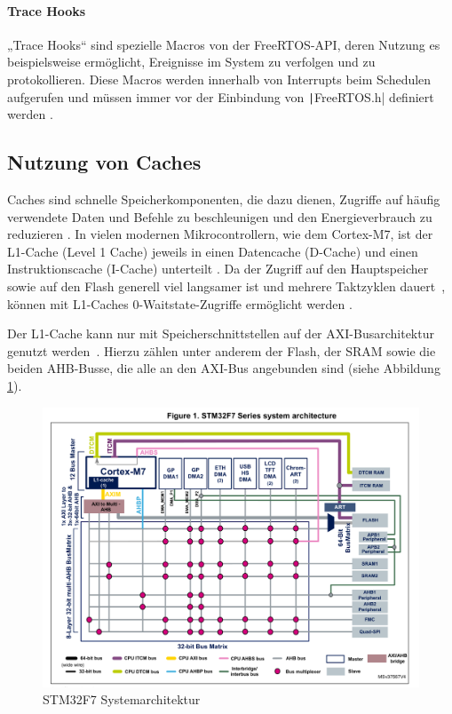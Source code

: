 \paragraph{Trace Hooks}

„Trace Hooks“ sind spezielle Macros von der FreeRTOS-API, deren Nutzung es
beispielsweise ermöglicht, Ereignisse im System zu verfolgen und zu
protokollieren. Diese Macros werden innerhalb von Interrupts beim Schedulen
aufgerufen und müssen immer vor der Einbindung von \texttt|FreeRTOS.h|
definiert werden \cite{freertos_rtos_trace_hooks}.

\subsection{Nutzung von Caches}

Caches sind schnelle Speicherkomponenten, die dazu dienen, Zugriffe auf häufig
verwendete Daten und Befehle zu beschleunigen und den Energieverbrauch zu
reduzieren \cite{ka001150}. In vielen modernen Mikrocontrollern, wie dem
Cortex-M7, ist der L1-Cache (Level 1 Cache) jeweils in einen Datencache
(D-Cache) und einen Instruktionscache (I-Cache) unterteilt \cite[S. 6]{an4667}.
Da der Zugriff auf den Hauptspeicher sowie auf den Flash generell viel langsamer
ist und mehrere Taktzyklen dauert~\cite{stm32_memory_sections}, können mit
L1-Caches 0-Waitstate-Zugriffe ermöglicht werden \cite[S. 6]{an4667}.

Der L1-Cache kann nur mit Speicherschnittstellen auf der \ac{AXI}-Busarchitektur
genutzt werden~\cite[S. 4]{an4839}. Hierzu zählen unter anderem der Flash, der
\ac{SRAM} sowie die beiden \ac{AHB}-Busse, die alle an den AXI-Bus angebunden
sind (siehe Abbildung \ref{fig:m7_sys_arch}).

\begin{figure}[htb]
    \centering
    \includegraphics[width=1\textwidth]{assets/m7_system_arch}
    \caption{STM32F7 Systemarchitektur \cite[S. 9]{an4667}}
    \label{fig:m7_sys_arch}
\end{figure}

